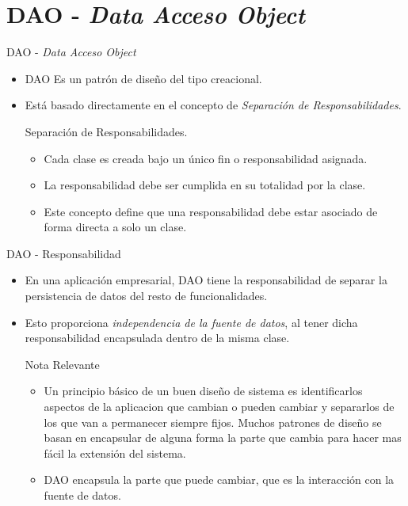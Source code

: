 \section{DAO - \emph{Data Acceso Object}}

\begin{frame}{DAO - \emph{Data Acceso Object}}
	\begin{itemize}
		\item DAO Es un patrón de diseño del tipo creacional.
		\item Est\'a basado directamente en el concepto de \emph{Separaci\'on de Responsabilidades}.
		\begin{block}{Separaci\'on de Responsabilidades.}
		\begin{itemize}
			\item Cada clase es creada bajo un \'unico fin o responsabilidad asignada.
			\item La responsabilidad debe ser cumplida en su totalidad por la clase.
			\item Este concepto define que una responsabilidad debe estar asociado de forma directa a solo un clase.
		\end{itemize}
		\end{block}
	\end{itemize}

\end{frame}

\begin{frame}{DAO - Responsabilidad}
	\begin{itemize}
		\item En una aplicación empresarial, DAO tiene la responsabilidad de separar la persistencia de datos del resto de funcionalidades.
		\item Esto proporciona \emph{independencia de la fuente de datos}, al tener dicha responsabilidad encapsulada dentro de la misma clase.
		\begin{block}{Nota Relevante}
		\begin{itemize}
			\item Un principio b\'asico de un buen diseño de sistema es identificarlos aspectos de la aplicacion
						que cambian o pueden cambiar y separarlos de los que van a permanecer siempre fijos. Muchos patrones de diseño se basan en encapsular de alguna forma
						la parte que cambia para hacer mas f\'acil la extensi\'on del sistema.
			\item DAO encapsula la parte que puede cambiar, que es la interacci\'on con la fuente de datos.
		\end{itemize}
		\end{block}
	\end{itemize}

\end{frame}

